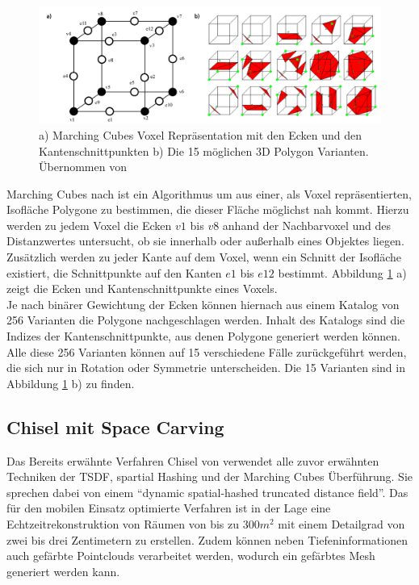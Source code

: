 \begin{figure}[h]
  \centering
	\includegraphics[width=1.0\textwidth]{content/images/methods/marchingcubes.png} 
  \caption{a) Marching Cubes Voxel Repräsentation mit den Ecken und den Kantenschnittpunkten b) Die 15 möglichen 3D Polygon Varianten. Übernommen von \citet{MarchingCubes:online}}
  \label{fig:marchingcubes}
\end{figure}

Marching Cubes nach \citet{lorensen1987marching} ist ein Algorithmus um aus einer, als Voxel repräsentierten, Isofläche Polygone zu bestimmen, die dieser Fläche möglichst nah kommt. Hierzu werden zu jedem Voxel die Ecken \(v1\) bis \(v8\) anhand der Nachbarvoxel und des Distanzwertes untersucht, ob sie innerhalb oder außerhalb eines Objektes liegen. Zusätzlich werden zu jeder Kante auf dem Voxel, wenn ein Schnitt der Isofläche existiert, die Schnittpunkte auf den Kanten \(e1\) bis \(e12\) bestimmt. Abbildung \ref{fig:marchingcubes} a) zeigt die Ecken und Kantenschnittpunkte eines Voxels. \\

Je nach binärer Gewichtung der Ecken können hiernach aus einem Katalog von 256 Varianten die Polygone nachgeschlagen werden. Inhalt des Katalogs sind die Indizes der Kantenschnittpunkte, aus denen Polygone generiert werden können. Alle diese 256 Varianten können auf 15 verschiedene Fälle zurückgeführt werden, die sich nur in Rotation oder Symmetrie unterscheiden. Die 15 Varianten sind in Abbildung \ref{fig:marchingcubes} b) zu finden. \citep{MarchingCubes:online} \\

\subsection{Chisel mit Space Carving}

Das Bereits erwähnte Verfahren Chisel von \citet{Klingensmith_2015_7924} verwendet alle zuvor erwähnten Techniken der TSDF, spartial Hashing und der Marching Cubes Überführung. Sie sprechen dabei von einem \enquote{dynamic spatial-hashed truncated distance field}. Das für den mobilen Einsatz optimierte Verfahren ist in der Lage eine Echtzeitrekonstruktion von Räumen von bis zu \(300 m^2\) mit einem Detailgrad von zwei bis drei Zentimetern zu erstellen. Zudem können neben Tiefeninformationen auch gefärbte Pointclouds verarbeitet werden, wodurch ein gefärbtes Mesh generiert werden kann. \citep{Klingensmith_2015_7924}\\

